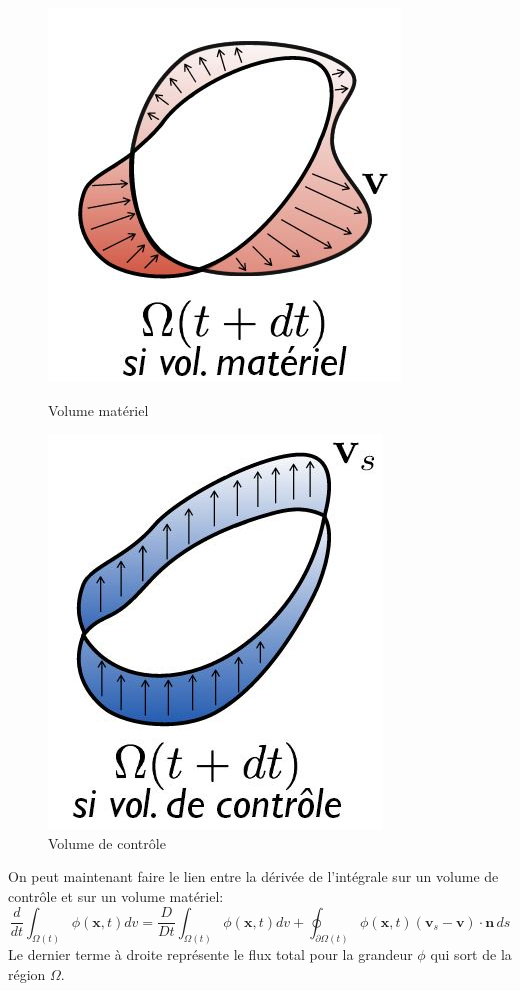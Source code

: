 \begin{figure}
    \begin{minipage}[b]{0.4\linewidth}
        \includegraphics[scale=0.5]{volmateriel.jpg}
        \caption{Volume matériel}
        \label{fig:volmat}
    \end{minipage}\hfill
    \begin{minipage}[b]{0.4\linewidth}
         \includegraphics[scale=0.5]{volcontrole.jpg}
         \caption{Volume de contrôle}
         \label{fig:volcont}
    \end{minipage}
\end{figure}

On peut maintenant faire le lien entre la dérivée de l'intégrale sur un volume de contrôle et sur un volume matériel:
\begin{equation}
\label{comparaison_mat_cont}
\boxed{\frac{d}{dt}\int_{\Omega (t)}\phi(\textbf{x},t)dv=\frac{D}{Dt}\int_{\Omega (t)}\phi(\textbf{x},t)dv+\oint_{\partial \Omega (t)}\phi(\textbf{x},t)(\textbf{v}_s-\textbf{v})\cdot \textbf{\^n}\,ds}
\end{equation}
Le dernier terme à droite représente le flux total pour la grandeur $\phi$ qui sort de la région $\Omega$.

